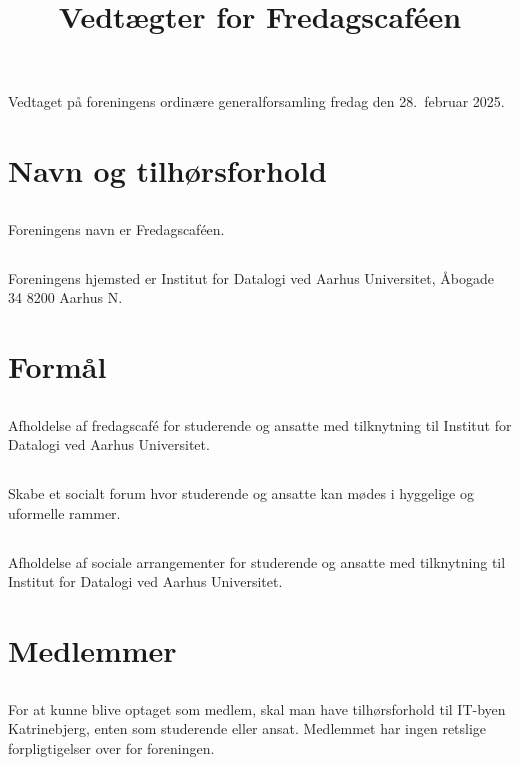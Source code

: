 \documentclass[danish,a4paper,twocolumn,oneside,article]{memoir}
\title{Vedtægter for Fredagscaféen}
\author{}
\date{}
\begin{document}
\maketitle
\newpage

Vedtaget på foreningens ordinære generalforsamling fredag den 28.\ februar 2025.

\chapter{Navn og tilhørsforhold}

\section{} Foreningens navn er Fredagscaféen.

\section{} Foreningens hjemsted er Institut for Datalogi ved Aarhus Universitet, Åbogade 34 8200 Aarhus N.

\chapter{Formål}

\section{} Afholdelse af fredagscafé for studerende og ansatte med tilknytning til Institut for Datalogi
ved Aarhus Universitet.

\section{} Skabe et socialt forum hvor studerende og ansatte kan mødes i hyggelige og uformelle rammer.

\section{} Afholdelse af sociale arrangementer for studerende og ansatte med tilknytning til Institut for Datalogi
ved Aarhus Universitet.


\chapter{Medlemmer}

\section{} For at kunne blive optaget som medlem, skal man have tilhørsforhold til IT-byen Katrinebjerg,
enten som studerende eller ansat. Medlemmet har ingen retslige forpligtigelser over for foreningen.
\end{document}
